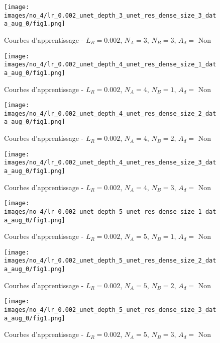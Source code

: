     \begin{figure}[H]
        \centering 
        \texttt{[image: images/no\_4/lr\_0.002\_unet\_depth\_3\_unet\_res\_dense\_size\_3\_data\_aug\_0/fig1.png]}
        \caption{Courbes d’apprentissage - \(L_R=0.002\), \(N_A=3\), \(N_B=3\), \(A_d= \) Non}
    \end{figure}

    \begin{figure}[H]
        \centering 
        \texttt{[image: images/no\_4/lr\_0.002\_unet\_depth\_4\_unet\_res\_dense\_size\_1\_data\_aug\_0/fig1.png]}
        \caption{Courbes d’apprentissage - \(L_R=0.002\), \(N_A=4\), \(N_B=1\), \(A_d= \) Non}
    \end{figure}
    
    \begin{figure}[H]
        \centering 
        \texttt{[image: images/no\_4/lr\_0.002\_unet\_depth\_4\_unet\_res\_dense\_size\_2\_data\_aug\_0/fig1.png]}
        \caption{Courbes d’apprentissage - \(L_R=0.002\), \(N_A=4\), \(N_B=2\), \(A_d= \) Non}
    \end{figure}
    
    \begin{figure}[H]
        \centering 
        \texttt{[image: images/no\_4/lr\_0.002\_unet\_depth\_4\_unet\_res\_dense\_size\_3\_data\_aug\_0/fig1.png]}
        \caption{Courbes d’apprentissage - \(L_R=0.002\), \(N_A=4\), \(N_B=3\), \(A_d= \) Non}
    \end{figure}

    \begin{figure}[H]
        \centering 
        \texttt{[image: images/no\_4/lr\_0.002\_unet\_depth\_5\_unet\_res\_dense\_size\_1\_data\_aug\_0/fig1.png]}
        \caption{Courbes d’apprentissage - \(L_R=0.002\), \(N_A=5\), \(N_B=1\), \(A_d= \) Non}
    \end{figure}
    
    \begin{figure}[H]
        \centering 
        \texttt{[image: images/no\_4/lr\_0.002\_unet\_depth\_5\_unet\_res\_dense\_size\_2\_data\_aug\_0/fig1.png]}
        \caption{Courbes d’apprentissage - \(L_R=0.002\), \(N_A=5\), \(N_B=2\), \(A_d= \) Non}
    \end{figure}
    
    \begin{figure}[H]
        \centering 
        \texttt{[image: images/no\_4/lr\_0.002\_unet\_depth\_5\_unet\_res\_dense\_size\_3\_data\_aug\_0/fig1.png]}
        \caption{Courbes d’apprentissage - \(L_R=0.002\), \(N_A=5\), \(N_B=3\), \(A_d= \) Non}
    \end{figure}


